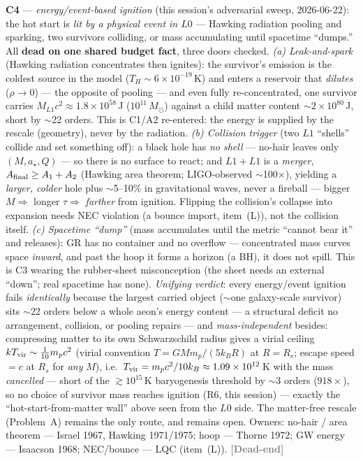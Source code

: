 \documentclass[11pt]{article}
\newcommand{\dead}{\textcolor{gray}{\textbf{[Dead-end]}}}
\newcommand{\msun}{M_\odot}
\begin{document}
\textbf{C4} --- \emph{energy/event-based ignition} (this session's adversarial sweep, 2026-06-22): the hot start is \emph{lit by a physical event in $L0$} --- Hawking radiation pooling and sparking, two survivors colliding, or mass accumulating until spacetime ``dumps.'' All \textbf{dead on one shared budget fact}, three doors checked. \emph{(a) Leak-and-spark} (Hawking radiation concentrates then ignites): the survivor's emission is the coldest source in the model ($T_H\sim6\times10^{-19}$\,K) and enters a reservoir that \emph{dilutes} ($\rho\to0$) --- the opposite of pooling --- and even fully re-concentrated, one survivor carries $M_{L1}c^2\approx1.8\times10^{58}$\,J ($10^{11}\,\msun$) against a child matter content $\sim2\times10^{80}$\,J, short by $\sim$22 orders. This is C1/A2 re-entered: the energy is supplied by the rescale (geometry), never by the radiation. \emph{(b) Collision trigger} (two $L1$ ``shells'' collide and set something off): a black hole has \emph{no shell} --- no-hair leaves only $(M,a_\star,Q)$ --- so there is no surface to react; and $L1+L1$ is a \emph{merger}, $A_{\rm final}\ge A_1+A_2$ (Hawking area theorem; LIGO-observed $\sim$100$\times$), yielding a \emph{larger, colder} hole plus $\sim$5--10\% in gravitational waves, never a fireball --- bigger $M\Rightarrow$ longer $\tau\Rightarrow$ \emph{farther} from ignition. Flipping the collision's collapse into expansion needs NEC violation (a bounce import, item~(L)), not the collision itself. \emph{(c) Spacetime ``dump''} (mass accumulates until the metric ``cannot bear it'' and releases): GR has no container and no overflow --- concentrated mass curves space \emph{inward}, and past the hoop it forms a horizon (a BH), it does not spill. This is C3 wearing the rubber-sheet misconception (the sheet needs an external ``down''; real spacetime has none). \emph{Unifying verdict}: every energy/event ignition fails \emph{identically} because the largest carried object ($\sim$one galaxy-scale survivor) sits $\sim$22 orders below a whole aeon's energy content --- a structural deficit no arrangement, collision, or pooling repairs --- and \emph{mass-independent} besides: compressing matter to its own Schwarzschild radius gives a virial ceiling $kT_{\rm vir}\sim\tfrac{1}{10}m_pc^2$ (virial convention $T=GMm_p/(5k_BR)$ at $R=R_s$; escape speed $=c$ at $R_s$ for \emph{any} $M$), i.e.\ $T_{\rm vir}=m_pc^2/10k_B\approx1.09\times10^{12}$\,K with the mass \emph{cancelled} --- short of the $\gtrsim10^{15}$\,K baryogenesis threshold by $\sim$3 orders ($918\times$), so no choice of survivor mass reaches ignition (R6, this session) --- exactly the ``hot-start-from-matter wall'' above seen from the $L0$ side. The matter-free rescale (Problem~A) remains the only route, and remains open. Owners: no-hair / area theorem --- Israel 1967, Hawking 1971/1975; hoop --- Thorne 1972; GW energy --- Isaacson 1968; NEC/bounce --- LQC (item~(L)). \dead\quad
\end{document}

